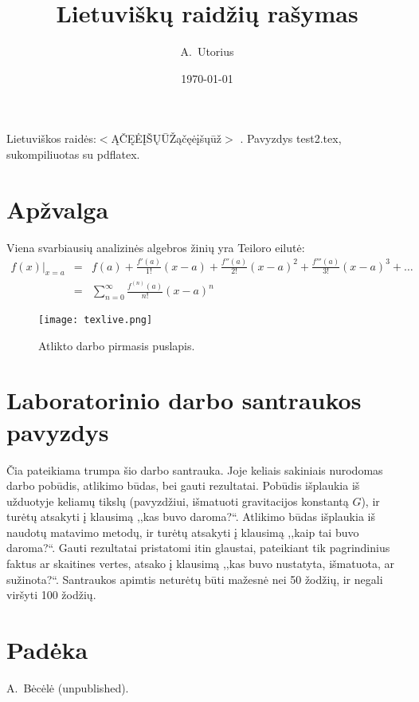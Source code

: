 \documentclass{article}
\begin{document}
\author{A.\ Utorius}
\title{Lietuvi{\v s}kų raid{\v z}ių ra{\v s}ymas}
\date{\today}

\maketitle

Lietuviškos raid{\.e}s:$<$ĄČĘĖĮŠŲŪŽąčęėįšųūž$>$ \cite{ref1}.
Pavyzdys {\sf test2.tex}, sukompiliuotas su \textsf{pdflatex}.

\section{Apžvalga}

Viena svarbiausių analizinės algebros žinių yra Teiloro eilutė:
\begin{align}
f(x)\big|_{x=a} &=& f(a)
 + \frac{f'(a)}{1!} (x-a)
 + \frac{f''(a)}{2!} (x-a)^2
 + \frac{f'''(a)}{3!} (x-a)^3
 + \dots \nonumber \\
 &=& \sum\limits_{n=0}^{\infty} \frac{f^{(n)}(a)}{n!} (x-a)^n
\end{align}

\begin{figure}[b]
\texttt{[image: texlive.png]}
\caption{Atlikto darbo pirmasis puslapis.}
\label{fig-report}
\end{figure}

\section*{Laboratorinio darbo santraukos pavyzdys}

Čia pateikiama trumpa šio darbo santrauka. Joje keliais sakiniais
nurodomas darbo pobūdis, atlikimo būdas, bei gauti rezultatai. Pobūdis
išplaukia iš užduotyje keliamų tikslų (pavyzdžiui, išmatuoti
gravitacijos konstantą $G$), ir turėtų atsakyti į klausimą ,,kas buvo
daroma?{}``. Atlikimo būdas išplaukia iš naudotų matavimo metodų, ir
turėtų atsakyti į klausimą ,,kaip tai buvo daroma?{}``. Gauti
rezultatai pristatomi itin glaustai, pateikiant tik pagrindinius
faktus ar skaitines vertes, atsako į klausimą ,,kas buvo nustatyta,
išmatuota, ar sužinota?{}``. Santraukos apimtis neturėtų būti mažesnė
nei 50 žodžių, ir negali viršyti 100 žodžių.

\section*{Padėka}

\textit{}

\begin{thebibliography}{99}
 A.\ Bėcėlė (unpublished).
\end{thebibliography}
\end{document}
